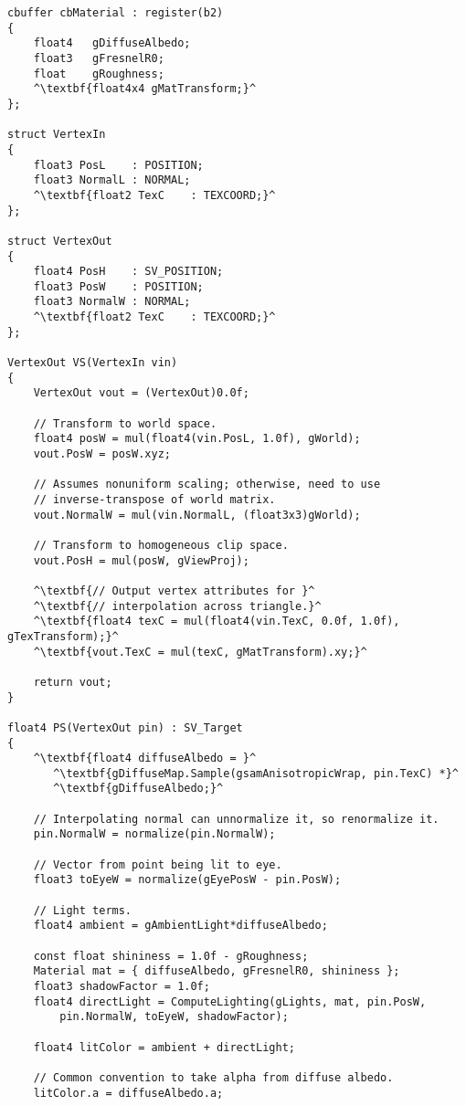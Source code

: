 \begin{lstlisting}[escapechar=^]
cbuffer cbMaterial : register(b2)
{
    float4   gDiffuseAlbedo;
    float3   gFresnelR0;
    float    gRoughness;
    ^\textbf{float4x4 gMatTransform;}^
};

struct VertexIn
{
    float3 PosL    : POSITION;
    float3 NormalL : NORMAL;
    ^\textbf{float2 TexC    : TEXCOORD;}^
};

struct VertexOut
{
    float4 PosH    : SV_POSITION;
    float3 PosW    : POSITION;
    float3 NormalW : NORMAL;
    ^\textbf{float2 TexC    : TEXCOORD;}^
};

VertexOut VS(VertexIn vin)
{
    VertexOut vout = (VertexOut)0.0f;
    
    // Transform to world space.
    float4 posW = mul(float4(vin.PosL, 1.0f), gWorld);
    vout.PosW = posW.xyz;

    // Assumes nonuniform scaling; otherwise, need to use 
    // inverse-transpose of world matrix.
    vout.NormalW = mul(vin.NormalL, (float3x3)gWorld);

    // Transform to homogeneous clip space.
    vout.PosH = mul(posW, gViewProj);
    
    ^\textbf{// Output vertex attributes for }^
    ^\textbf{// interpolation across triangle.}^
    ^\textbf{float4 texC = mul(float4(vin.TexC, 0.0f, 1.0f), gTexTransform);}^
    ^\textbf{vout.TexC = mul(texC, gMatTransform).xy;}^
    
    return vout;
}

float4 PS(VertexOut pin) : SV_Target
{
    ^\textbf{float4 diffuseAlbedo = }^
       ^\textbf{gDiffuseMap.Sample(gsamAnisotropicWrap, pin.TexC) *}^
       ^\textbf{gDiffuseAlbedo;}^
    
    // Interpolating normal can unnormalize it, so renormalize it.
    pin.NormalW = normalize(pin.NormalW);

    // Vector from point being lit to eye. 
    float3 toEyeW = normalize(gEyePosW - pin.PosW);

    // Light terms.
    float4 ambient = gAmbientLight*diffuseAlbedo;

    const float shininess = 1.0f - gRoughness;
    Material mat = { diffuseAlbedo, gFresnelR0, shininess };
    float3 shadowFactor = 1.0f;
    float4 directLight = ComputeLighting(gLights, mat, pin.PosW,
        pin.NormalW, toEyeW, shadowFactor);

    float4 litColor = ambient + directLight;

    // Common convention to take alpha from diffuse albedo.
    litColor.a = diffuseAlbedo.a;


\end{lstlisting}
